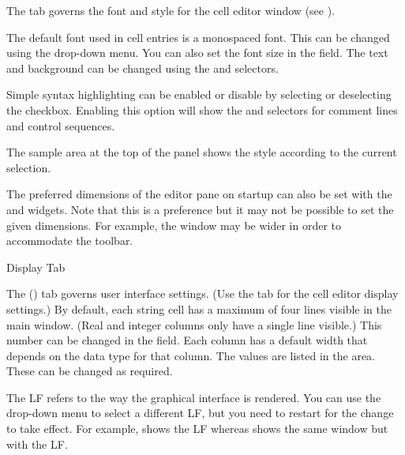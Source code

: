 The  tab governs the font and style for
the cell editor window (see ).

The default font used in cell entries is a monospaced font. This can be
changed using the  drop-down menu.
You can also set the font size in the 
 field.
The text  and background  can be changed 
using the 
and  selectors.

Simple syntax highlighting can be enabled or disable by selecting
or deselecting the  checkbox.
Enabling this option will show the 
 and
 selectors for comment
lines and control sequences.

The sample area at the top of the panel shows the style according to
the current selection.

The preferred dimensions of the editor pane on startup can also be
set with the  and
 widgets. Note that this is a
preference but it may not be possible to set the given dimensions.
For example, the window may be wider in order to accommodate the
toolbar.


 {%
 }
 {Display Tab}

The  () tab governs user interface settings.
(Use the  tab for the cell editor display
settings.)
By default, each
string cell has a maximum of four lines visible in the main window.
(Real and integer columns only have a single line visible.) This
number can be changed in the 
field. Each column has a default width that depends on the data type
for that column. The values are listed in the 
 area. These can be changed
as required.

The \gls{LF} refers to the way the graphical interface
is rendered. You can use the drop-down menu to
select a different \gls{LF}, but you need to restart  
for the change to take effect. For example, 
shows the  \gls{LF} whereas
shows the same window but with the  \gls{LF}.

